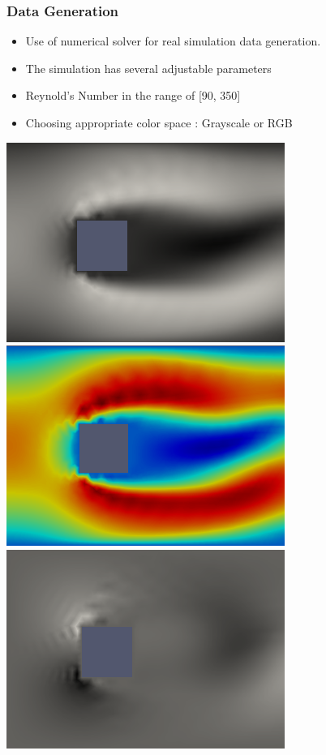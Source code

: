 \documentclass[18pt]{beamer}
\begin{document}
\begin{frame}[t]
  \frametitle{Data Generation}
  \begin{itemize}
  \item Use of numerical solver for real simulation data generation.
  \item The simulation has several adjustable parameters
  \item Reynold's Number in the range of [90, 350]
  \item Choosing appropriate color space : Grayscale or RGB
  \end{itemize}

  \begin{center}
    \includegraphics[scale=0.27]{images/x-direction-gray} \hspace{0.7cm}
    \includegraphics[scale=0.27]{images/x-direction-rgb} \\ \vspace{0.2cm}
    \includegraphics[scale=0.27]{images/y-direction-gray} \hspace{0.7cm}

\end{center}
\end{frame}
\end{document}
